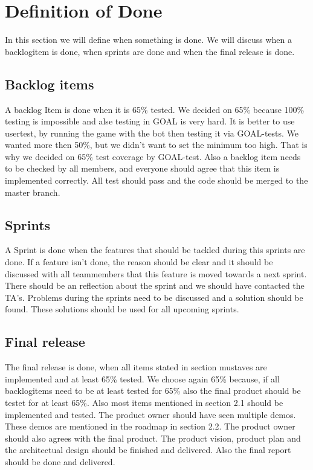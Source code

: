 \newpage
\section{Definition of Done}
In this section we will define when something is done. We will discuss when a backlogitem is done, when sprints are done and when the final release is done.
\subsection{Backlog items}
A backlog Item is done when it is 65\% tested. We decided on 65\% because 100\% testing is impossible and alse testing in GOAL is very hard. It is better to use usertest, by running the game with the bot then testing it via GOAL-tests. We wanted more then 50\%, but we didn't want to set the minimum too high. That is why we decided on 65\% test coverage by GOAL-test.  Also a backlog item needs to be checked by all members, and everyone should agree that this item is implemented correctly. All test should pass and the code should be merged to the master branch.
\subsection{Sprints}
A Sprint is done when the features that should be tackled during this sprints are done. If a feature isn't done, the reason should be clear and it should be discussed with all teammembers that this feature is moved towards a next sprint. There should be an reflection about the sprint and we should have contacted the TA's. Problems during the sprints need to be discussed and a solution should be found. These solutions should be used for all upcoming sprints.
\subsection{Final release}
The final release is done, when all items stated in section mustaves are implemented and at least 65\% tested. We choose again 65\% because, if all backlogitems need to be at least tested for 65\% also the final product should be testet for at least 65\%. Also most items mentioned in section 2.1 should be implemented and tested. \newline
The product owner should have seen multiple demos. These demos are mentioned in the roadmap in section 2.2. The product owner should also agrees with the final product. \newline
The product vision, product plan and the architectual design should be finished and delivered. Also the final report should be done and delivered. 